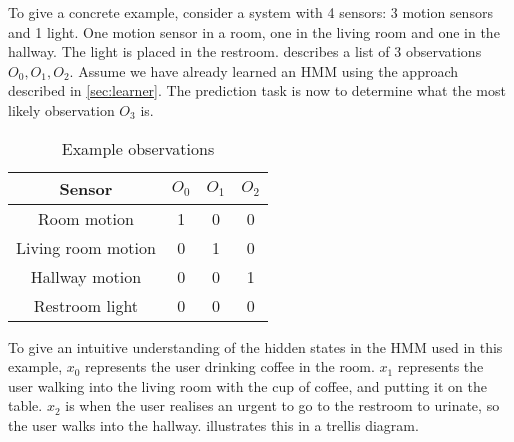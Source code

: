 To give a concrete example, consider a system with 4 sensors: 3 motion sensors and 1 light. One motion sensor in a room, one in the living room and one in the hallway. The light is placed in the restroom.  describes a list of 3 observations $O_0,O_1,O_2$. Assume we have already learned an HMM using the approach described in \cref{sec:learner}. The prediction task is now to determine what the most likely observation $O_3$ is.

\begin{table}[htbp]
  \centering
  \begin{tabular}{c c c c}
    \toprule
    Sensor             & $O_0$ & $O_1$ & $O_2$ \\ \midrule
    Room motion     & 1     & 0     & 0 \\
    Living room motion & 0     & 1     & 0 \\
    Hallway motion     & 0     & 0     & 1 \\
    Restroom light     & 0     & 0     & 0 \\ \bottomrule
  \end{tabular}
  \caption[Observations]{Example observations}\label{tab:observations}
\end{table}

To give an intuitive understanding of the hidden states in the HMM used in this example, $x_0$ represents the user drinking coffee in the room. $x_1$ represents the user walking into the living room with the cup of coffee, and putting it on the table. $x_2$ is when the user realises an urgent to go to the restroom to urinate, so the user walks into the hallway.  illustrates this in a trellis diagram.

